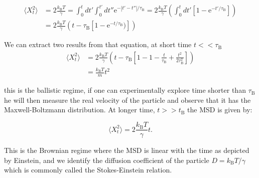 \begin{equation}
	\begin{aligned}
	\langle X_t ^2 \rangle & =   2 \frac{k_\mathrm{B}T}{\gamma} = \int _0 ^t dt' \int _0 ^{t'} dt'' \mathrm{e} ^ {- |t' - t''| / \tau_\mathrm{B}} = 2 \frac{k_\mathrm{B}T}{\gamma} \left( \int_0 ^t dt' \left[1 - \mathrm{e}^{-t'/\tau_\mathrm{B}} \right] \right) \\
	& = 2 \frac{k_\mathrm{B} T}{\gamma} \left( t - \tau_\mathrm{B} \left[ 1 - \mathrm{e}^{-t/\tau_\mathrm{B}}) \right] \right)
	\end{aligned}
\end{equation}

We can extract two results from that equation, at short time $t << \tau_\mathrm{B}$
\begin{equation}
	\begin{aligned}
	\langle X_t ^2 \rangle & =  2 \frac{k_\mathrm{B} T}{\gamma} \left( t - \tau_\mathrm{B} \left[ 1 - 1 - \frac{t}{\tau_\mathrm{B}} + \frac{t^2}{ 2 \tau_\mathrm{B} ^2}\right]         \right) \\
	& = \frac{k_\mathrm{B} T}{m} t^2
	\end{aligned}
\end{equation}

this is the ballistic regime, if one can experimentally explore time shorter than $\tau _ \mathrm{B} $ he will then measure the real velocity of the particle and observe that it has the Maxwell-Boltzmann distribution. At longer time, $t >> t_\mathrm{B}$ the \gls{MSD} is given by:

\begin{equation}
	\langle X_t ^2 \rangle = 2 \frac{k_\mathrm{B}T}{\gamma} t.
\end{equation}

This is the Brownian regime where the \gls{MSD} is linear with the time as depicted by Einstein, and we identify the diffusion coefficient of the particle $ D = k_\mathrm{B} T / \gamma $ which is commonly called the Stokes-Einstein relation.